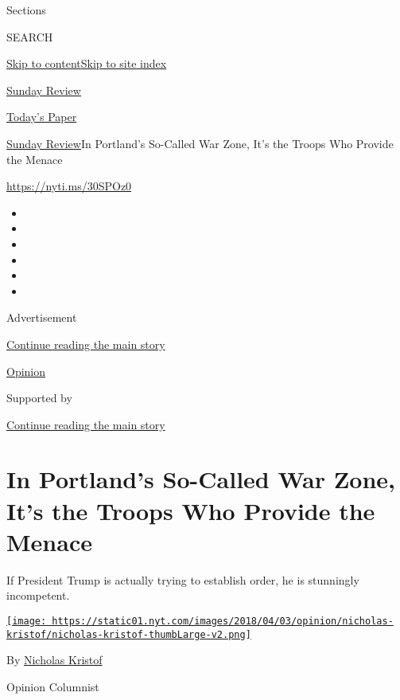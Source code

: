 Sections

SEARCH

\protect\hyperlink{site-content}{Skip to
content}\protect\hyperlink{site-index}{Skip to site index}

\href{https://www.nytimes.com/section/opinion/sunday}{Sunday Review}

\href{https://myaccount.nytimes.com/auth/login?response_type=cookie\&client_id=vi}{}

\href{https://www.nytimes.com/section/todayspaper}{Today's Paper}

\href{/section/opinion/sunday}{Sunday Review}\textbar{}In Portland's
So-Called War Zone, It's the Troops Who Provide the Menace

\href{https://nyti.ms/30SPOz0}{https://nyti.ms/30SPOz0}

\begin{itemize}
\item
\item
\item
\item
\item
\item
\end{itemize}

Advertisement

\protect\hyperlink{after-top}{Continue reading the main story}

\href{/section/opinion}{Opinion}

Supported by

\protect\hyperlink{after-sponsor}{Continue reading the main story}

\hypertarget{in-portlands-so-called-war-zone-its-the-troops-who-provide-the-menace}{%
\section{In Portland's So-Called War Zone, It's the Troops Who Provide
the
Menace}\label{in-portlands-so-called-war-zone-its-the-troops-who-provide-the-menace}}

If President Trump is actually trying to establish order, he is
stunningly incompetent.

\href{https://www.nytimes.com/column/nicholas-kristof}{\texttt{[image: https://static01.nyt.com/images/2018/04/03/opinion/nicholas-kristof/nicholas-kristof-thumbLarge-v2.png]}}

By \href{https://www.nytimes.com/column/nicholas-kristof}{Nicholas
Kristof}

Opinion Columnist

